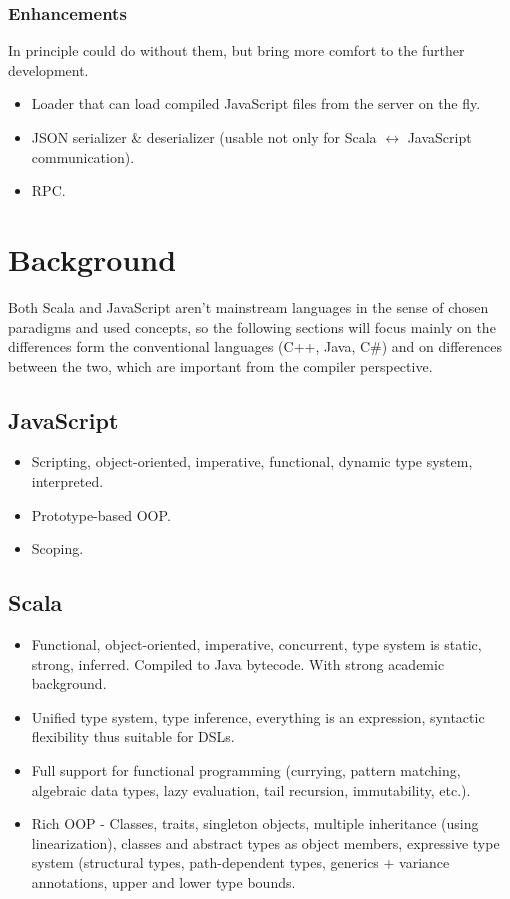 \documentclass[12pt,a4paper]{report}
\begin{document}
\subsection{Enhancements}

In principle could do without them, but bring more comfort to the further development.

\begin{itemize}
\item Loader that can load compiled JavaScript files from the server on the fly.
\item JSON serializer \& deserializer (usable not only for Scala $\leftrightarrow$ JavaScript communication).
\item RPC.
\end{itemize}



\chapter{Background}

Both Scala and JavaScript aren't mainstream languages in the sense of chosen paradigms and used concepts, so the following sections will focus mainly on the differences form the conventional languages (C++, Java, C\#) and on differences between the two, which are important from the compiler perspective.

\section{JavaScript}

\begin{itemize}
\item Scripting, object-oriented, imperative, functional, dynamic type system, interpreted. 
\item Prototype-based OOP.
\item Scoping.
\end{itemize}

\section{Scala}

\begin{itemize}
\item Functional, object-oriented, imperative, concurrent, type system is static, strong, inferred. Compiled to Java bytecode. With strong academic background.
\item Unified type system, type inference, everything is an expression, syntactic flexibility thus suitable for DSLs.
\item Full support for functional programming (currying, pattern matching, algebraic data types, lazy evaluation, tail recursion, immutability, etc.).
\item Rich OOP - Classes, traits, singleton objects, multiple inheritance (using linearization), classes and abstract types as object members, expressive type system (structural types, path-dependent types, generics + variance annotations, upper and lower type bounds.
\end{itemize}
\end{document}
